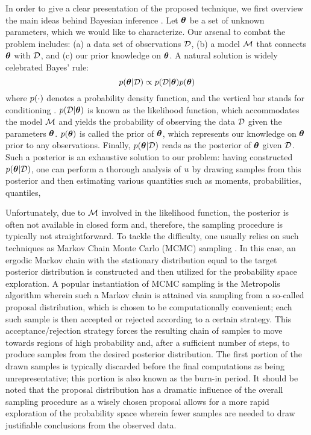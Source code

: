 In order to give a clear presentation of the proposed technique, we first overview the main ideas behind Bayesian inference \cite{gelman2004}.
Let ${\boldsymbol\theta}$ be a set of unknown parameters, which we would like to characterize. Our arsenal to combat the problem includes: (a) a data set of observations $\mathcal{D}$, (b) a model $\model$ that connects ${\boldsymbol\theta}$ with $\mathcal{D}$, and (c) our prior knowledge on ${\boldsymbol\theta}$. A natural solution is widely celebrated Bayes' rule:
\[
  \f{\vparam | \Data} \propto \f{\Data | \vparam} \f{\vparam}
\]
where $\f{\cdot}$ denotes a probability density function, and the vertical bar stands for conditioning \cite{durrett2010}.
$\f{\Data | \vparam}$ is known as the likelihood function, which accommodates the model $\model$ and yields the probability of observing the data $\mathcal{D}$ given the parameters ${\boldsymbol\theta}$.
$\f{\vparam}$ is called the prior of ${\boldsymbol\theta}$, which represents our knowledge on ${\boldsymbol\theta}$ prior to any observations.
Finally, $\f{\vparam | \Data}$ reads as the posterior of ${\boldsymbol\theta}$ given $\mathcal{D}$. Such a posterior is an exhaustive solution to our problem: having constructed $\f{\vparam | \Data}$, one can perform a thorough analysis of $u$ by drawing samples from this posterior and then estimating various quantities such as moments, probabilities, quantiles, \etc

Unfortunately, due to $\model$ involved in the likelihood function, the posterior is often not available in closed form and, therefore, the sampling procedure is typically not straightforward.
To tackle the difficulty, one usually relies on such techniques as Markov Chain Monte Carlo (MCMC) sampling \cite{gelman2004}. In this case, an ergodic Markov chain with the stationary distribution equal to the target posterior distribution is constructed and then utilized for the probability space exploration.
A popular instantiation of MCMC sampling is the Metropolis algorithm wherein such a Markov chain is attained via sampling from a so-called proposal distribution, which is chosen to be computationally convenient; each such sample is then accepted or rejected according to a certain strategy. This acceptance/rejection strategy forces the resulting chain of samples to move towards regions of high probability and, after a sufficient number of steps, to produce samples from the desired posterior distribution. The first portion of the drawn samples is typically discarded before the final computations as being unrepresentative; this portion is also known as the burn-in period. It should be noted that the proposal distribution has a dramatic influence of the overall sampling procedure as a wisely chosen proposal allows for a more rapid exploration of the probability space wherein fewer samples are needed to draw justifiable conclusions from the observed data.
